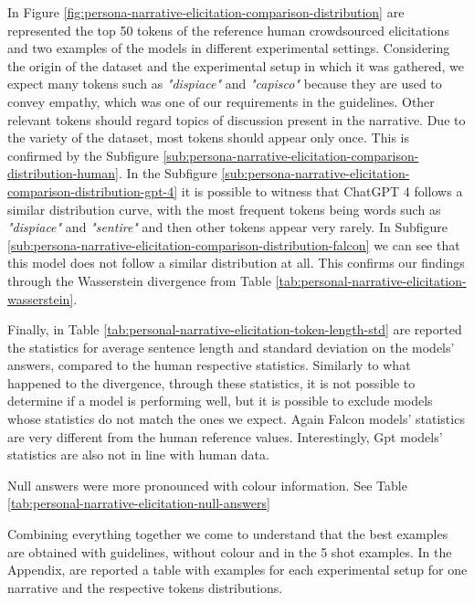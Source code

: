 In Figure \ref{fig:persona-narrative-elicitation-comparison-distribution} are represented the top 50 tokens of the reference human crowdsourced elicitations and two examples of the models in different experimental settings. Considering the origin of the dataset and the experimental setup in which it was gathered, we expect many tokens such as \emph{"dispiace"} and \emph{"capisco"} because they are used to convey empathy, which was one of our requirements in the guidelines. Other relevant tokens should regard topics of discussion present in the narrative. Due to the variety of the dataset, most tokens should appear only once. This is confirmed by the Subfigure \ref{sub:persona-narrative-elicitation-comparison-distribution-human}. 
In the Subfigure \ref{sub:persona-narrative-elicitation-comparison-distribution-gpt-4} it is possible to witness that ChatGPT 4 follows a similar distribution curve, with the most frequent tokens being words such as \emph{"dispiace"} and \emph{"sentire"} and then other tokens appear very rarely. 
In Subfigure \ref{sub:persona-narrative-elicitation-comparison-distribution-falcon} we can see that this model does not follow a similar distribution at all. This confirms our findings through the Wasserstein divergence from Table \ref{tab:personal-narrative-elicitation-wasserstein}.

% 
Finally, in Table \ref{tab:personal-narrative-elicitation-token-length-std} are reported the statistics for average sentence length and standard deviation on the models' answers, compared to the human respective statistics. Similarly to what happened to the divergence, through these statistics, it is not possible to determine if a model is performing well, but it is possible to exclude models whose statistics do not match the ones we expect. Again Falcon models' statistics are very different from the human reference values. Interestingly, Gpt models' statistics are also not in line with human data. 


Null answers were more pronounced with colour information. See Table \ref{tab:personal-narrative-elicitation-null-answers}

Combining everything together we come to understand that the best examples are obtained with guidelines, without colour and in the 5 shot examples. In the Appendix, are reported a table with examples for each experimental setup for one narrative and the respective tokens distributions.